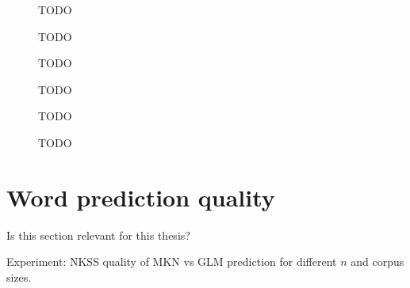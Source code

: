 \clearpage
\thispagestyle{empty}
\begin{figure}[p]
  \centering
  \vspace*{\fill}

  \begin{minipage}{.45\textwidth}
    
    \caption{TODO}
  \end{minipage}
  \hspace{.02\textwidth}
  \begin{minipage}{.45\textwidth}
    
    \caption{TODO}
  \end{minipage}

  \vspace*{.02\textwidth}

  \begin{minipage}{0.45\textwidth}
    
    \caption{TODO}
  \end{minipage}
  \hspace{.02\textwidth}
  \begin{minipage}{0.45\textwidth}
    
    \caption{TODO}
  \end{minipage}

  \vspace*{.02\textwidth}

  \begin{minipage}{0.45\textwidth}
    
    \caption{TODO}
  \end{minipage}
  \hspace{.02\textwidth}
  \begin{minipage}{0.45\textwidth}
    
    \caption{TODO}
  \end{minipage}

  \vspace*{\fill}
\end{figure}
\restoregeometry
\clearpage


\section{Word prediction quality}

\begin{draft}
Is this section relevant for this thesis?

Experiment: NKSS quality of MKN vs GLM prediction for different $n$ and corpus
sizes.
\end{draft}
